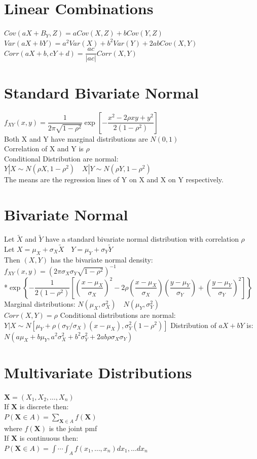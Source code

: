 \documentclass[openany]{book}
\begin{document}
\begin{flushleft}
\section{Linear Combinations}
$Cov(aX+B_Y,Z)=aCov(X,Z)+bCov(Y,Z)$\medbreak
$Var(aX+bY)=a^2Var(X)+b^2Var(Y)+2abCov(X,Y)$\medbreak
$Corr(aX+b,cY+d)=\dfrac{ac}{|ac|}Corr(X,Y)$
\section{Standard Bivariate Normal}
$f_{XY}(x,y)=\dfrac{1}{2\pi\sqrt{1-\rho^2}}\exp{\left[-\dfrac{x^2-2\rho xy+y^2}{2(1-\rho^2)}\right]}$\\
Both X and Y have marginal distributions are $N(0,1)$\\
Correlation of X and Y is $\rho$\\
Conditional Distribution are normal:\\
$Y|X \sim N(\rho X,1-\rho^2) \quad X|Y \sim N(\rho Y, 1-\rho^2)$\\
The means are the regression lines of Y on X and X on Y respectively.
\section{Bivariate Normal}
Let $\tilde{X}$ and $\tilde{Y}$ have a standard bivariate normal distribution with correlation $\rho$\\
Let $X=\mu_X+\sigma_X\tilde{X} \quad Y=\mu_Y+\sigma_Y\tilde{Y}$\\
Then $(X,Y)$ has the bivariate normal density:\\
$f_{XY}(x,y)=\left(2\pi \sigma_X \sigma_Y \sqrt{1-\rho^2} \right)^{-1}$\\
*$\exp{\left\{-\dfrac{1}{2(1-\rho^2)}\left[\left(\dfrac{x-\mu_X}{\sigma_X} \right)^2- 2\rho \left(\dfrac{x-\mu_X}{\sigma_X} \right)\left(\dfrac{y-\mu_Y}{\sigma_Y} \right)+\left(\dfrac{y-\mu_Y}{\sigma_Y} \right)^2 \right] \right\}}$\medbreak
Marginal distributions: $N(\mu_X,\sigma^2_X) \quad N(\mu_Y,\sigma^2_Y)$\\
$Corr(X,Y)=\rho$\medbreak
Conditional distributions are normal:\\
$Y|X \sim N[\mu_Y+\rho(\sigma_Y/\sigma_X)(x-\mu_X),\sigma^2_Y(1-\rho^2)]$\medbreak
Distribution of $aX+bY$ is:\\
$N(a\mu_X+b\mu_Y,a^2\sigma^2_X+b^2\sigma^2_Y+2ab\rho \sigma_X \sigma_Y)$
\section{Multivariate Distributions}
$\boldsymbol{X}=(X_1,X_2,\dots, X_n)$\\
If $\boldsymbol{X}$ is discrete then:\\
$P(\boldsymbol{X} \in A)=\sum_{\boldsymbol{X} \in A} f(\boldsymbol{X})$\\
where $f(\boldsymbol{X})$ is the joint pmf\\
If $\boldsymbol{X}$ is continuous then:\\
$P(\boldsymbol{X}\in A)=\int \cdots \int_{A}f(x_1,\dots,x_n)dx_1,\dots dx_n$\medbreak

\end{flushleft}
\end{document}

